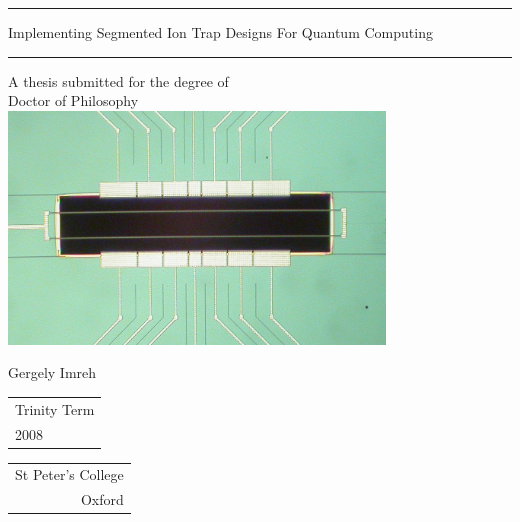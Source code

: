 %

\begin{titlepage}
\begin{center}
\vspace{10mm} \hrule \vspace{10mm} 
{\huge Implementing Segmented Ion Trap Designs For Quantum Computing}\\
\begin{Large}
\vspace{10mm} \hrule \vspace{10mm}
A thesis submitted for the degree of \\ Doctor of Philosophy \\ 
\vspace{40mm}
		\centering
		\includegraphics[width=10cm]{chapter4/sandia/trapphoto}


\vspace{40mm}
Gergely Imreh\vfill
\begin{tabular}{l}
Trinity Term \\ 2008
\end{tabular}
\hspace{\fill}
\begin{tabular}{r}
St Peter's College \\ Oxford
\end{tabular}
\end{Large}
\end{center}
\end{titlepage}


